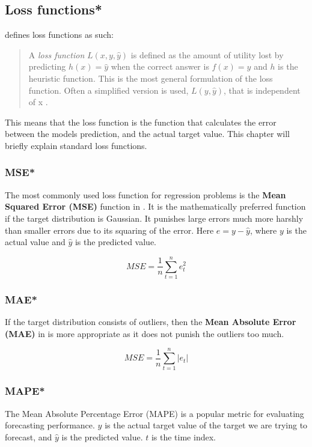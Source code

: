 \subsection{Loss functions*}
\label{section:BT:Loss}
\citeauthor{Russel2012}  defines loss functions as such:

\begin{quotation}
  A \textit{loss function} $L(x, y, \hat{y})$ is defined as the amount of utility lost by predicting
  $h(x)=\hat{y}$ when the correct answer is $f(x) = y$ and $h$ is the heuristic function.
  This is the most general formulation of the loss function. Often a simplified version is used,
  $L(y, \hat{y})$, that is independent of x \cite[p. 710-711]{Russel2012}. 
\end{quotation}

This means that the loss function is the function that calculates the error between the
models prediction, and the actual target value.
This chapter will briefly explain standard loss functions.


\subsubsection{MSE*}
The most commonly used loss function for regression problems is the
\textbf{Mean Squared Error (MSE)} function in .
It is the mathematically preferred function if the target distribution is Gaussian.
It punishes large errors much more harshly than smaller errors due to its squaring of the error.
Here $e = y - \hat{y}$, where $y$ is the actual value and $\hat{y}$ is the predicted value.

\begin{equation}
  \label{eq:mean-squared-error}
  MSE = \frac{1}{n} \sum_{t=1}^n e_t^2
\end{equation}

\subsubsection{MAE*}
If the target distribution consists of outliers, then the
\textbf{Mean Absolute Error (MAE)} in  is more appropriate
as it does not punish the outliers too much.

\begin{equation}
  \label{eq:mean-absolute-error}
  MSE = \frac{1}{n} \sum_{t=1}^n |e_t|
\end{equation}

\subsubsection{MAPE*}
The Mean Absolute Percentage Error  (MAPE) is a popular metric for evaluating forecasting performance.
$y$ is the actual target value of the target we are trying to forecast, and $\hat{y}$ is the predicted value.
$t$ is the time index.

